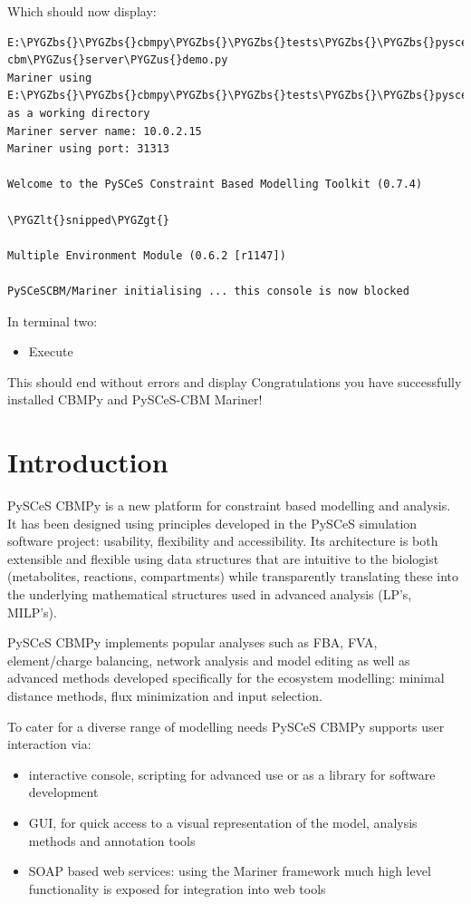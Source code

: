 \documentclass[a4paper,11pt,english]{sphinxmanual}
\def\PYGZbs{\char`\\}
\def\PYGZus{\char`\_}
\def\PYGZlt{\char`\<}
\def\PYGZgt{\char`\>}
\begin{document}
Which should now display:

\begin{Verbatim}[commandchars=\\\{\}]
E:\PYGZbs{}\PYGZbs{}cbmpy\PYGZbs{}\PYGZbs{}tests\PYGZbs{}\PYGZbs{}pyscesmariner\PYGZgt{}python cbm\PYGZus{}server\PYGZus{}demo.py
Mariner using E:\PYGZbs{}\PYGZbs{}cbmpy\PYGZbs{}\PYGZbs{}tests\PYGZbs{}\PYGZbs{}pyscesmariner as a working directory
Mariner server name: 10.0.2.15
Mariner using port: 31313

Welcome to the PySCeS Constraint Based Modelling Toolkit (0.7.4)

\PYGZlt{}snipped\PYGZgt{}

Multiple Environment Module (0.6.2 [r1147])

PySCeSCBM/Mariner initialising ... this console is now blocked
\end{Verbatim}

In terminal two:
\begin{itemize}
\item {} 
Execute 

\end{itemize}

This should end without errors and display  Congratulations
you have successfully installed CBMPy and PySCeS-CBM Mariner!


\chapter{Introduction}
\label{manual_doc:introduction}\label{manual_doc:introducing-cbmpy}\label{manual_doc::doc}
PySCeS CBMPy is a new platform for constraint based modelling and analysis. It has been designed using principles
developed in the PySCeS simulation software project: usability, flexibility and accessibility. Its architecture
is both extensible and flexible using data structures that are intuitive to the biologist (metabolites, reactions, compartments)
while transparently translating these into the underlying mathematical structures used in advanced analysis (LP's, MILP's).

PySCeS CBMPy implements popular analyses such as FBA, FVA, element/charge balancing, network analysis and model editing as
well as advanced methods developed specifically for the ecosystem modelling: minimal distance methods, flux minimization and input selection.

To cater for a diverse range of modelling needs PySCeS CBMPy supports user interaction via:
\begin{itemize}
\item {} 
interactive console, scripting for advanced use or as a library for software development

\item {} 
GUI, for quick access to a visual representation of the model, analysis methods and annotation tools

\item {} 
SOAP based web services: using the Mariner framework much high level functionality is exposed for integration into web tools

\end{itemize}
\end{document}
